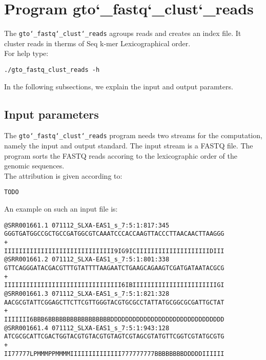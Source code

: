 \section{Program gto\char`_fastq\char`_clust\char`_reads}
The \texttt{gto\char`_fastq\char`_clust\char`_reads} agroups reads and creates an index file. It cluster reads in therms of Seq k-mer Lexicographical order.\\
For help type:
\begin{lstlisting}
./gto_fastq_clust_reads -h
\end{lstlisting}
In the following subsections, we explain the input and output paramters.

\subsection*{Input parameters}

The \texttt{gto\char`_fastq\char`_clust\char`_reads} program needs two streams for the computation,
namely the input and output standard. The input stream is a FASTQ file. The program sorts the FASTQ reads accoring to the lexicographic order of the genomic sequences.\\
The attribution is given according to:
\begin{lstlisting}
TODO
\end{lstlisting}
An example on such an input file is:
\begin{lstlisting}
@SRR001661.1 071112_SLXA-EAS1_s_7:5:1:817:345
GGGTGATGGCCGCTGCCGATGGCGTCAAATCCCACCAAGTTACCCTTAACAACTTAAGGG
+
IIIIIIIIIIIIIIIIIIIIIIIIIIIIII9IG9ICIIIIIIIIIIIIIIIIIIIIDIII
@SRR001661.2 071112_SLXA-EAS1_s_7:5:1:801:338
GTTCAGGGATACGACGTTTGTATTTTAAGAATCTGAAGCAGAAGTCGATGATAATACGCG
+
IIIIIIIIIIIIIIIIIIIIIIIIIIIIIIII6IBIIIIIIIIIIIIIIIIIIIIIIIGI
@SRR001661.3 071112_SLXA-EAS1_s_7:5:1:821:328
AACGCGTATTCGGAGCTTCTTCGTTGGGTACGTGCGCCTATTATGCGGCGCGATTGCTAT
+
IIIIIII6BBB6BBBBBBBBBBBBBBBBBDDDDDDDDDDDDDDDDDDDDDDDDDDDDDDD
@SRR001661.4 071112_SLXA-EAS1_s_7:5:1:943:128
ATCGCGCATTCGACTGGTACGTGTACGTGTAGTCGTAGCGTATGTTCGGTCGTATGCGTG
+
II77777LPMMMPPMMMMIIIIIIIIIIIIII777777777BBBBBBBBDDDDDIIIIII
\end{lstlisting}

